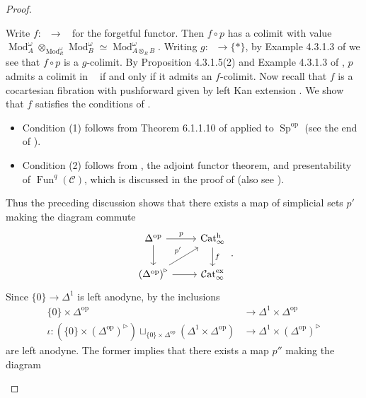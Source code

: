 \documentclass{article}
\DeclareMathOperator{\Cat}{\mathcal{C}at} %
\DeclareMathOperator{\Catex}{\Cat_\infty^{ex}} %
\DeclareMathOperator{\Cath}{Cat^h_\infty} %
\DeclareMathOperator{\Fun}{Fun} %
\DeclareMathOperator{\Mod}{Mod} %
\DeclareMathOperator{\Spectra}{Sp} %
\newcommand{\op}{\mathrm{op}} %
\theoremstyle{definition}
\begin{document}
\begin{proof}
\begin{enumerate}[label=(\arabic*)]
        Write $ f \colon \Cath \to \Catex $ for the forgetful functor. 
        Then $ f \circ p $ has a colimit with value $ \Mod_A^\omega \otimes_{\Mod_R^\omega} \Mod_B^\omega \simeq \Mod_{A \otimes_R B}^\omega $. 
        Writing $ g \colon \Catex \to \{*\} $, by Example 4.3.1.3 of \cite{HTT} we see that $ f \circ p $ is a $ g $-colimit. 
        By Proposition 4.3.1.5(2) and Example 4.3.1.3 of \cite{HTT}, $ p $ admits a colimit in $ \Cath $ if and only if it admits an $ f $-colimit. 
        Now recall that $ f $ is a cocartesian fibration with pushforward given by left Kan extension \cite[Corollary 1.4.2]{CDHHLMNNSI}. 
        We show that $ f $ satisfies the conditions of \cite[Corollary 4.3.1.11]{HTT}. 
        \begin{itemize}
            \item Condition (1) follows from Theorem 6.1.1.10 of \cite{LurHA} applied to $ \Spectra^\op $ (see the end of \cite[Construction 1.1.26]{CDHHLMNNSI}). 
            \item Condition (2) follows from \cite[Corollary 1.4.2]{CDHHLMNNSI}, the adjoint functor theorem, and presentability of $ \Fun^q(\mathcal{C}) $, which is discussed in the proof of \cite[Lemma 5.3.3]{CDHHLMNNSI} (also see \cite[Remark 6.1.1.11]{LurHA}). 
        \end{itemize}
        Thus the preceding discussion shows that there exists a map of simplicial sets $ p' $ making the diagram commute
        \begin{equation*}
        \begin{tikzcd}
            \Delta^\op \ar[d] \ar[r,"p"] & \Cath \ar[d,"f"] \\
            \left(\Delta^\op\right)^{\triangleright} \ar[r]\ar[ru,"{p'}"] & \Catex 
        \end{tikzcd}\,.
        \end{equation*}
        Since $ \{0\} \to \Delta^1 $ is left anodyne, by \cite[Corollary 2.1.2.7]{HTT} the inclusions
        \begin{align*}
            \{0\} \times \Delta^\op & \to \Delta^1 \times \Delta^\op \\
            \iota \colon \left(\{0\} \times (\Delta^\op)^\triangleright\right) \sqcup_{\{0\} \times \Delta^\op}\left(\Delta^1 \times \Delta^\op \right) & \to \Delta^1 \times \left(\Delta^\op\right)^\triangleright 
        \end{align*}
        are left anodyne. 
        The former implies that there exists a map $ p'' $ making the diagram 
        \begin{equation*}

\end{equation*}
\end{enumerate}
\end{proof}
\end{document}
